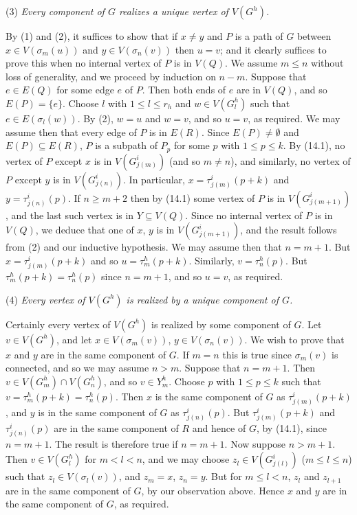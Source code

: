 \hspace*{12pt}(3) \textit{Every component of $G$ realizes a unique vertex of $V(G^h)$.}

By (1) and (2), it suffices to show that if $x \ne y$ and $P$ is a path of $G$ between $x \in V(\sigma_m(u))$ and $y \in V(\sigma_n(v))$ then $u = v$; and it clearly suffices to prove this when no internal vertex of $P$ is in $V(Q)$. We assume $m \le n$ without loss of generality, and we proceed by induction on $n - m$. Suppose that $e \in E(Q)$ for some edge $e$ of $P$. Then both ends of $e$ are in $V(Q)$, and so $E(P) = \{e\}$. Choose $l$ with $1 \le l \le r_h$ and $w \in V(G^h_l)$ such that $e \in E(\sigma_l(w))$. By (2), $w = u$ and $w = v$, and so $u = v$, as required. We may assume then that every edge of $P$ is in $E(R)$. Since $E(P) \ne \emptyset$ and $E(P) \subseteq E(R)$, $P$ is a subpath of $P_p$ for some $p$ with $1 \le p \le k$. By (14.1), no vertex of $P$ except $x$ is in $V(G^i_{j(m)})$ (and so $m \ne n$), and similarly, no vertex of $P$ except $y$ is in $V(G^i_{j(n)})$. In particular, $x = \tau^i_{j(m)}(p+k)$ and $y = \tau^i_{j(n)}(p)$. If $n \ge m + 2$ then by (14.1) some vertex of $P$ is in $V(G^i_{j(m+1)})$, and the last such vertex is in $Y \subseteq V(Q)$. Since no internal vertex of $P$ is in $V(Q)$, we deduce that one of $x$, $y$ is in $V(G^i_{j(m+1)})$, and the result follows from (2) and our inductive hypothesis. We may assume then that $n = m + 1$. But $x = \tau^i_{j(m)}(p+k)$ and so $u = \tau^h_m(p+k)$. Similarly, $v = \tau^h_n(p)$. But $\tau^h_m(p+k) = \tau^h_n(p)$ since $n = m + 1$, and so $u = v$, as required.

\hspace*{12pt}(4) \textit{Every vertex of $V(G^h)$ is realized by a unique component of $G$.}

Certainly every vertex of $V(G^h)$ is realized by some component of $G$. Let $v \in V(G^h)$, and let $x \in V(\sigma_m(v))$, $y \in V(\sigma_n(v))$. We wish to prove that $x$ and $y$ are in the same component of $G$. If $m = n$ this is true since $\sigma_m(v)$ is connected, and so we may assume $n > m$. Suppose that $n = m + 1$. Then $v \in V(G^h_m) \cap V(G^h_n)$, and so $v \in Y^h_m$. Choose $p$ with $1 \le p \le k$ such that $v = \tau^h_m(p+k) = \tau^h_n(p)$. Then $x$ is the same component of $G$ as $\tau^i_{j(m)}(p+k)$, and $y$ is in the same component of $G$ as $\tau^i_{j(n)}(p)$. But $\tau^i_{j(m)}(p+k)$ and $\tau^i_{j(n)}(p)$ are in the same component of $R$ and hence of $G$, by (14.1), since $n = m + 1$. The result is therefore true if $n = m + 1$. Now suppose $n > m + 1$. Then $v \in V(G^h_l)$ for $m < l < n$, and we may choose $z_l \in V(G^i_{j(l)})$ ($m \le l \le n$) such that $z_l \in V(\sigma_l(v))$, and $z_m = x$, $z_n = y$. But for $m \le l < n$, $z_l$ and $z_{l+1}$ are in the same component of $G$, by our observation above. Hence $x$ and $y$ are in the same component of $G$, as required.

